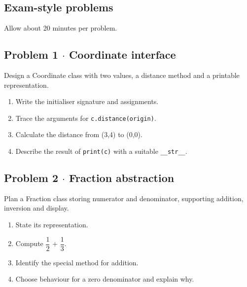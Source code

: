 \documentclass[11pt]{article}
\begin{document}
\begin{keepsection}
\section{Exam-style problems}

Allow about 20 minutes per problem.

\begin{keepsection}
\subsection{Problem 1 \ensuremath{\cdot} Coordinate interface}

Design a Coordinate class with two values, a distance method and a printable representation.

\begin{enumerate}
\item Write the initialiser signature and assignments.
\item Trace the arguments for \texttt{c.distance(origin)}.
\item Calculate the distance from (3,4) to (0,0).
\item Describe the result of \texttt{print(c)} with a suitable \texttt{\_\_str\_\_}.
\end{enumerate}

\end{keepsection}

\begin{keepsection}
\subsection{Problem 2 \ensuremath{\cdot} Fraction abstraction}

Plan a Fraction class storing numerator and denominator, supporting addition, inversion and display.

\begin{enumerate}
\item State its representation.
\item Compute {\small\ensuremath{\dfrac{1}{2}}} + {\small\ensuremath{\dfrac{1}{3}}}.
\item Identify the special method for addition.
\item Choose behaviour for a zero denominator and explain why.
\end{enumerate}

\end{keepsection}
\end{keepsection}
\end{document}
